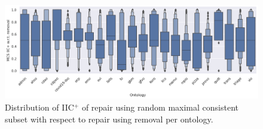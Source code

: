 \begin{figure}[htbp]
  \centering
  \includegraphics[width=\textwidth]{resources/eiic-mcs-rem-ontology-violin.png}
  \caption{Distribution of IIC$^+$ of repair using random maximal consistent subset with respect to repair using removal per ontology.}
\end{figure}

